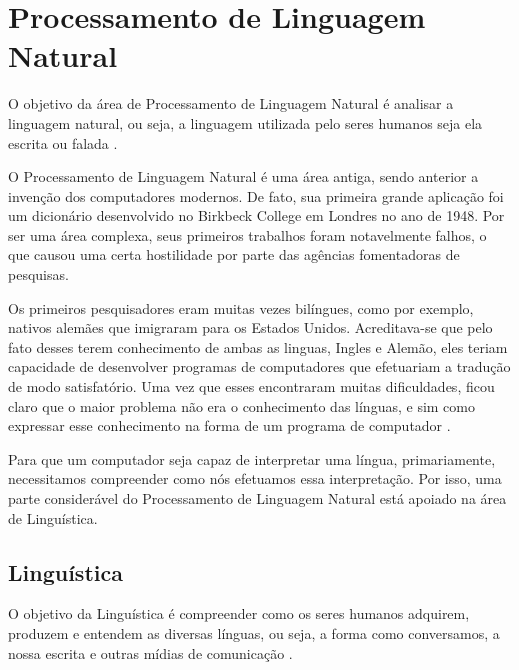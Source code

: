 \chapter{Processamento de Linguagem Natural}
\label{cap:Processamento}


O objetivo da área de Processamento de Linguagem Natural é analisar a linguagem
natural, ou seja, a linguagem utilizada pelo seres humanos seja ela escrita
ou falada \cite{manningschutze1999}.

O Processamento de Linguagem Natural é uma área antiga, sendo anterior a
invenção dos computadores modernos. De fato, sua primeira grande aplicação foi
um dicionário desenvolvido no Birkbeck College em Londres no ano de 1948. Por ser
uma área complexa, seus primeiros trabalhos foram notavelmente falhos, o que
causou uma certa hostilidade por parte das agências fomentadoras de pesquisas.

Os primeiros pesquisadores eram muitas vezes bilíngues, como por exemplo,
nativos alemães que imigraram para os Estados Unidos. Acreditava-se que pelo
fato desses terem conhecimento de ambas as linguas, Ingles e Alemão, eles teriam
capacidade de desenvolver programas de computadores que efetuariam a tradução
de modo satisfatório. Uma vez que esses encontraram muitas dificuldades,
ficou claro que o maior problema não era o conhecimento das
línguas, e sim como expressar esse conhecimento na forma de um programa de
computador \cite{history}.

Para que um computador seja capaz de interpretar uma
língua, primariamente, necessitamos compreender como nós efetuamos essa
interpretação.
Por isso, uma parte considerável do Processamento de Linguagem Natural está apoiado na área de Linguística.

\section{Linguística}

O objetivo da Linguística é compreender como os seres humanos adquirem, produzem
e entendem as diversas línguas, ou seja, a forma como conversamos, a nossa
escrita e outras mídias de comunicação \cite{manningschutze1999}.

